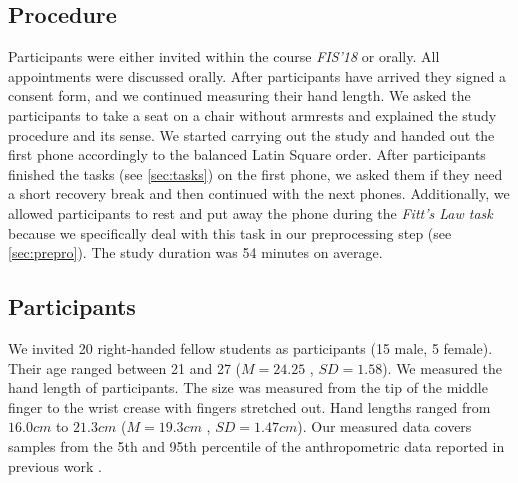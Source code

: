\subsection{Procedure}
Participants were either invited within the course \textit{FIS'18} or orally.
All appointments were discussed orally.
After participants have arrived they signed a consent form, and we continued measuring their hand length.
We asked the participants to take a seat on a chair without armrests and explained the study procedure and its sense.
We started carrying out the study and handed out the first phone accordingly to the balanced Latin Square order. 
After participants finished the tasks (see \cref{sec:tasks}) on the first phone, we asked them if they need a short recovery break and then continued with the next phones.
Additionally, we allowed participants to rest and put away the phone during the \textit{Fitt's Law task} because we specifically deal with this task in our preprocessing step (see \cref{sec:prepro}).
The study duration was 54 minutes on average.

\subsection{Participants}
We invited 20 right-handed fellow students as participants (15 male, 5 female).
Their age ranged between 21 and 27 ($ M=24.25$ , $SD=1.58 $). 
We measured the hand length of participants. 
The size was measured from the tip of the middle finger to the wrist crease with fingers stretched out.
Hand lengths ranged from $16.0cm$ to $21.3cm$ ($M=19.3cm$ , $SD=1.47cm$).
Our measured data covers samples from the 5th and 95th percentile of the anthropometric data reported in previous work \cite{Poston}.  
